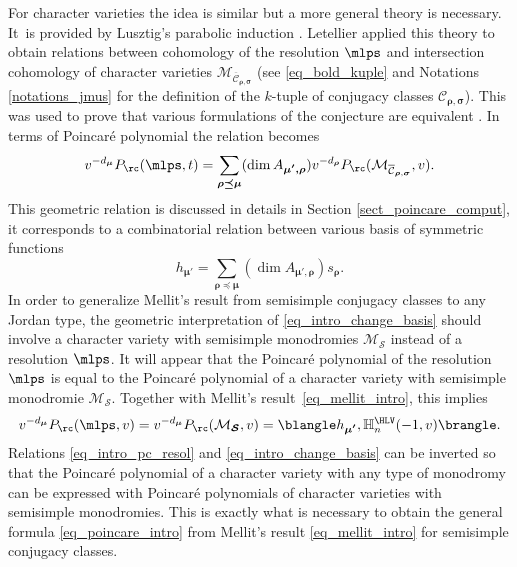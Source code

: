 For character varieties the idea is similar but a more general theory is necessary. It~is provided by Lusztig's parabolic induction \cite{Lusztig1984,lusztig_character_sheaves,Lusztig1986}. Letellier applied this theory to obtain relations between cohomology of the resolution $\mlps$ and intersection cohomology of character varieties $\mathcal{M}_{\overline{\mathcal{C}}_{\boldsymbol{\rho},\boldsymbol{\sigma}}}$ (see \eqref{eq_bold_kuple} and Notations \ref{notations_jmus} for the definition of the $k$-tuple of conjugacy classes $\mathcal{C}_{\boldsymbol{\rho},\boldsymbol{\sigma}}$). This was used to prove that various formulations of the conjecture are equivalent \cite[Prop.\,5.7]{Letellier_gl}.
In terms of Poincaré polynomial the relation becomes
\begin{equation}\label{eq_intro_pc_resol}
v^{-d_{\boldsymbol{\mu}}} P_{\rc}(\mlps,t) = \sum_{\boldsymbol{\rho\preceq\mu}}(\dim A_{\boldsymbol{\mu',\rho}}) v^{-d_{\boldsymbol{\rho}}} P_{\rc}(\mathcal{M}_{\overline{\mathcal{C}}_{\boldsymbol{\rho},\boldsymbol{\sigma}}}, v).
\end{equation}
This geometric relation is discussed in details in Section \ref{sect_poincare_comput}, it corresponds to a combinatorial relation between various basis of symmetric functions
\begin{equation}\label{eq_intro_change_basis}
h_{\boldsymbol{\mu'}} = \sum_{\boldsymbol{\rho\preceq\mu}} \left(\dim A_{\boldsymbol{\mu',\rho}}\right) s_{\boldsymbol{\rho}}.
\end{equation}
In order to generalize Mellit's result from semisimple conjugacy classes to any Jordan type, the geometric interpretation of \eqref{eq_intro_change_basis} should involve a character variety with semisimple monodromies $\mathcal{M}_{\boldsymbol{\mathcal{S}}}$ instead of a resolution $\mlps$. It will appear that the Poincaré polynomial of the resolution $\mlps$ is equal to the Poincaré polynomial of a character variety with semisimple monodromie $\mathcal{M}_{\boldsymbol{\mathcal{S}}}$. Together with Mellit's result~\eqref{eq_mellit_intro}, this implies
\[
v^{-d_{\boldsymbol{\mu}}} P_{\rc}(\mlps,v) = v^{-d_{\boldsymbol{\mu}}} P_{\rc}(\mathcal{M}_{\boldsymbol{\mathcal{S}}},v) =\blangle h_{\boldsymbol{\mu'}}, \mathbb{H}_n^{\HLV}(-1,v)\brangle.
\]
Relations \eqref{eq_intro_pc_resol} and \eqref{eq_intro_change_basis} can be inverted so that the Poincaré polynomial of a character variety with any type of monodromy can be expressed with Poincaré polynomials of character varieties with semisimple monodromies. This is exactly what is necessary to obtain the general formula \eqref{eq_poincare_intro} from Mellit's result \eqref{eq_mellit_intro} for semisimple conjugacy classes.


